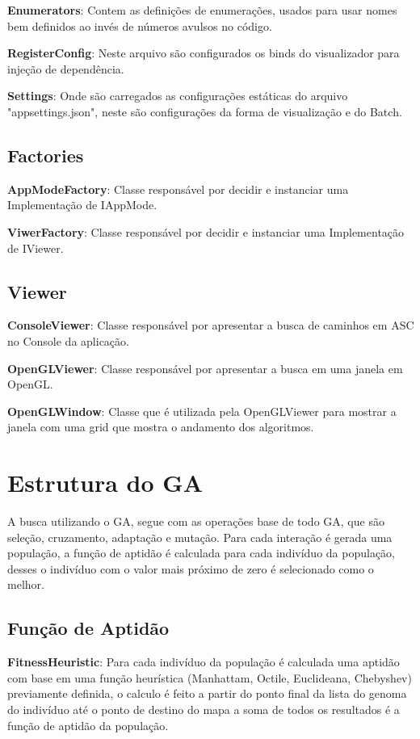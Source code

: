 \textbf{Enumerators}: Contem as definições de enumerações, usados para usar nomes bem definidos ao invés de números avulsos no código.

\textbf{RegisterConfig}: Neste arquivo são configurados os binds do visualizador para injeção de dependência.

\textbf{Settings}: Onde são carregados as configurações estáticas do arquivo "appsettings.json", neste são configurações da forma de visualização e do Batch.

\subsection{Factories}
\textbf{AppModeFactory}: Classe responsável por decidir e instanciar uma Implementação de IAppMode.

\textbf{ViwerFactory}: Classe responsável por decidir e instanciar uma Implementação de IViewer.


\subsection{Viewer}
\textbf{ConsoleViewer}: Classe responsável por apresentar a busca de caminhos em ASC no Console da aplicação.

\textbf{OpenGLViewer}: Classe responsável por apresentar a busca em uma janela em OpenGL.

\textbf{OpenGLWindow}: Classe que é utilizada pela OpenGLViewer para mostrar a janela com uma grid que mostra o andamento dos algoritmos.

\section{Estrutura do GA}
A busca utilizando o GA, segue com as operações base de todo GA, que são seleção, cruzamento, adaptação e mutação. 
Para cada interação é gerada uma população, a função de aptidão é calculada para cada indivíduo da população, 
desses o indivíduo com o valor mais próximo de zero é selecionado como o melhor.

\subsection{Função de Aptidão}

\textbf{FitnessHeuristic}: Para cada indivíduo da população é calculada uma aptidão com base em uma função heurística (Manhattam, Octile, Euclideana, Chebyshev)
previamente definida, o calculo é feito a partir do ponto final da lista do genoma do indivíduo até o ponto de destino do mapa
a soma de todos os resultados é a função de aptidão da população.

